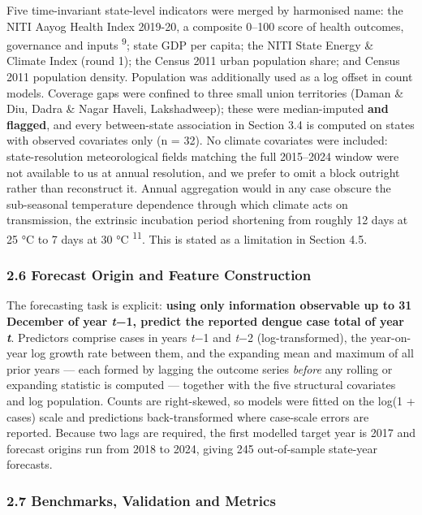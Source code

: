 \documentclass[
  10pt,
  twocolumn]{article}
\begin{document}
Five time-invariant state-level indicators were merged by harmonised
name: the NITI Aayog Health Index 2019-20, a composite 0--100 score of
health outcomes, governance and inputs \textsuperscript{9}; state GDP
per capita; the NITI State Energy \& Climate Index (round 1); the Census
2011 urban population share; and Census 2011 population density.
Population was additionally used as a log offset in count models.
Coverage gaps were confined to three small union territories (Daman \&
Diu, Dadra \& Nagar Haveli, Lakshadweep); these were median-imputed
\textbf{and flagged}, and every between-state association in Section 3.4
is computed on states with observed covariates only (n = 32). No climate
covariates were included: state-resolution meteorological fields
matching the full 2015--2024 window were not available to us at annual
resolution, and we prefer to omit a block outright rather than
reconstruct it. Annual aggregation would in any case obscure the
sub-seasonal temperature dependence through which climate acts on
transmission, the extrinsic incubation period shortening from roughly 12
days at 25 °C to 7 days at 30 °C \textsuperscript{11}. This is stated as
a limitation in Section 4.5.

\subsubsection{2.6 Forecast Origin and Feature
Construction}\label{forecast-origin-and-feature-construction}

The forecasting task is explicit: \textbf{using only information
observable up to 31 December of year \emph{t}−1, predict the reported
dengue case total of year \emph{t}}. Predictors comprise cases in years
\emph{t}−1 and \emph{t}−2 (log-transformed), the year-on-year log growth
rate between them, and the expanding mean and maximum of all prior years
--- each formed by lagging the outcome series \emph{before} any rolling
or expanding statistic is computed --- together with the five structural
covariates and log population. Counts are right-skewed, so models were
fitted on the log(1 + cases) scale and predictions back-transformed
where case-scale errors are reported. Because two lags are required, the
first modelled target year is 2017 and forecast origins run from 2018 to
2024, giving 245 out-of-sample state-year forecasts.

\subsubsection{2.7 Benchmarks, Validation and
Metrics}\label{benchmarks-validation-and-metrics}
\end{document}
